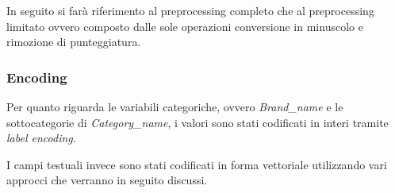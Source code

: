 In seguito si farà riferimento al preprocessing completo che al preprocessing
limitato ovvero composto dalle sole operazioni conversione in minuscolo e
rimozione di punteggiatura.

\subsubsection{Encoding}

Per quanto riguarda le variabili categoriche, ovvero \textit{Brand\_name} e le
sottocategorie di \textit{Category\_name},
i valori sono stati codificati in interi tramite \textit{label encoding}.

I campi testuali invece sono stati codificati in forma vettoriale utilizzando
vari approcci che verranno in seguito discussi.


